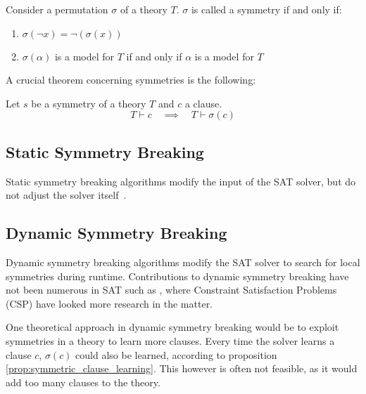 

				Consider a permutation $\sigma$ of a theory $T$.
				$\sigma$ is called a symmetry if and only if:

				\begin{enumerate}
					\item $\sigma(\neg x) = \neg(\sigma( x ))$
					\item $\sigma(\alpha )$ is a model for $T$ if and only if $\alpha$ is a model for
						$T$
				\end{enumerate}

				A crucial theorem concerning symmetries is the following: \\

				\begin{proposition}
					\label{prop:symmetric_clause_learning}
					Let $s$ be a symmetry of a theory $T$ and $c$ a clause.
					\begin{equation}
						T \vdash c \quad \implies \quad T \vdash \sigma( c )
					\end{equation}
				\end{proposition}

		\subsection{Static Symmetry Breaking}
			Static symmetry breaking algorithms modify the input of the SAT solver, but do not
			adjust the solver itself~\cite{sakallah2009symmetry}.

		\subsection{Dynamic Symmetry Breaking}
			Dynamic symmetry breaking algorithms modify the SAT solver to search for local
			symmetries during runtime. Contributions to dynamic symmetry breaking have not been
			numerous in SAT such as \cite{sabharwal2005symchaff}, where Constraint Satisfaction
			Problems (CSP) have looked more research in the matter.

			One theoretical approach in dynamic symmetry breaking would be to exploit symmetries in
			a theory to learn more clauses.
			Every time the solver learns a clause $c$, $\sigma(c)$ could also be learned, according
			to proposition \ref{prop:symmetric_clause_learning}.
			This however is often not feasible, as it would add too many clauses to the theory.

